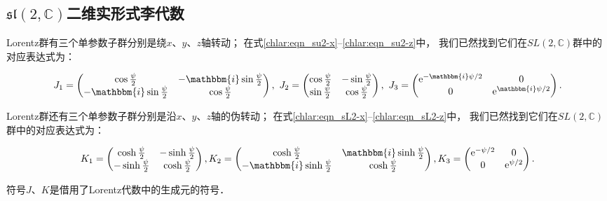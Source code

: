 \subsection{$\mathfrak{sl}(2,\mathbb{C})$二维实形式李代数}\label{chlar:sec_sl-LA}

Lorentz群有三个单参数子群分别是绕$x$、$y$、$z$轴转动；
在式\eqref{chlar:eqn_su2-x}--\eqref{chlar:eqn_su2-z}中，
我们已然找到它们在$SL(2,\mathbb{C})$群中的对应表达式为：
\begin{small}
\begin{align*}
    J_1=\begin{pmatrix}
        \cos \frac{\psi}{2} & -\mathbbm{i} \sin \frac{\psi}{2} \\
        -\mathbbm{i} \sin \frac{\psi}{2} & \cos \frac{\psi}{2}
    \end{pmatrix}, \ 
    J_2=\begin{pmatrix}
        \cos \frac{\psi}{2} & -\sin \frac{\psi}{2} \\
        \sin \frac{\psi}{2} & \cos \frac{\psi}{2}
    \end{pmatrix}, \
     J_3=\begin{pmatrix}
        \mathrm{e}^{-\mathbbm{i} \psi / 2} & 0 \\
        0 & \mathrm{e}^{\mathbbm{i} \psi / 2}
   \end{pmatrix}.
\end{align*}  %
\end{small}

Lorentz群还有三个单参数子群分别是沿$x$、$y$、$z$轴的伪转动；
在式\eqref{chlar:eqn_sL2-x}--\eqref{chlar:eqn_sL2-z}中，
我们已然找到它们在$SL(2,\mathbb{C})$群中的对应表达式为：
\begin{small}
\begin{align*}
    K_1=\begin{pmatrix}
        \cosh \frac{\psi}{2} & -\sinh \frac{\psi}{2} \\
        -\sinh \frac{\psi}{2} & \cosh \frac{\psi}{2}
    \end{pmatrix}, 
    K_2=\begin{pmatrix}
        \cosh \frac{\psi}{2} & \mathbbm{i} \sinh \frac{\psi}{2} \\
        -\mathbbm{i} \sinh \frac{\psi}{2} & \cosh \frac{\psi}{2}
    \end{pmatrix},
    K_3=\begin{pmatrix}
        \mathrm{e}^{-\psi / 2} & 0 \\
        0 & \mathrm{e}^{\psi / 2}
\end{pmatrix} .
\end{align*}  %
\end{small}
符号$J$、$K$是借用了Lorentz代数中的生成元的符号．

